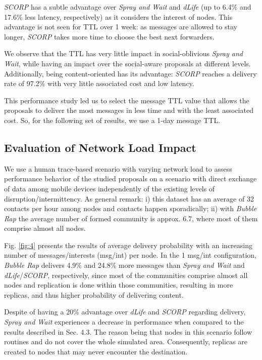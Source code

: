 \documentclass[lnicst]{svmultln}
\begin{document}
\emph{SCORP }has a subtle advantage over \emph{Spray and Wait }and
\emph{dLife }(up to 6.4\% and 17.6\% less latency, respectively) as
it considers the interest of nodes. This advantage is not seen for
TTL over 1 week: as messages are allowed to stay longer, \emph{SCORP}
takes more time to choose the best next forwarders.

We observe that the TTL has very little impact in social-oblivious
\emph{Spray and Wait}, while having an impact over the social-aware
proposals at different levels. Additionally, being content-oriented
has its advantage: \emph{SCORP} reaches a delivery rate of 97.2\%
with very little associated cost and low latency. 

This performance study led us to select the message TTL value that
allows the proposals to deliver the most messages in less time and
with the least associated cost. So, for the following set of results,
we use a 1-day message TTL.


\subsection{Evaluation of Network Load Impact \label{sub:Evaluation-of-LoadImpact}}

We use a human trace-based scenario with varying network load to assess
performance behavior of the studied proposals on a scenario with direct
exchange of data among mobile devices independently of the existing
levels of disruption/intermittency. As general remark: i) this dataset
has an average of 32 contacts per hour among nodes and contacts happen
sporadically; ii) with \emph{Bubble Rap} the average number of formed
community is approx. 6.7, where most of them comprise almost all nodes.

Fig. \ref{fig:4} presents the results of average delivery probability
with an increasing number of messages/interests (msg/int) per node.
In the 1 msg/int configuration, \emph{Bubble Rap }delivers 4.9\% and
24.8\% more messages than \emph{Spray and Wait} and \emph{dLife}/\emph{SCORP},
respectively, since most of the communities comprise almost all nodes
and replication is done within those communities, resulting in more
replicas, and thus higher probability of delivering content. 

Despite of having a 20\% advantage over \emph{dLife} and \emph{SCORP}
regarding delivery, \emph{Spray and Wait }experiences a decrease in
performance when compared to the results described in Sec. 4.3. The
reason being that nodes in this scenario follow routines and do not
cover the whole simulated area. Consequently, replicas are created
to nodes that may never encounter the destination. 
\end{document}
